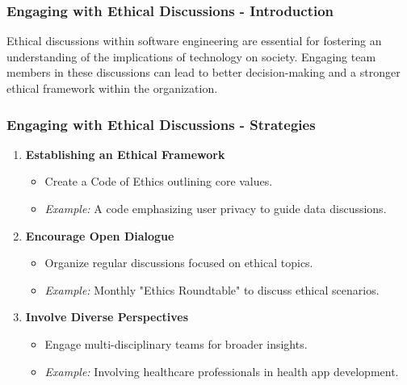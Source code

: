 \documentclass{beamer}
\begin{document}
\begin{frame}[fragile]
    \frametitle{Engaging with Ethical Discussions - Introduction}
    Ethical discussions within software engineering are essential for fostering an understanding of the implications of technology on society. Engaging team members in these discussions can lead to better decision-making and a stronger ethical framework within the organization.
\end{frame}

\begin{frame}[fragile]
    \frametitle{Engaging with Ethical Discussions - Strategies}
    \begin{enumerate}
        \item \textbf{Establishing an Ethical Framework}
        \begin{itemize}
            \item Create a Code of Ethics outlining core values.
            \item \textit{Example:} A code emphasizing user privacy to guide data discussions.
        \end{itemize}

        \item \textbf{Encourage Open Dialogue}
        \begin{itemize}
            \item Organize regular discussions focused on ethical topics.
            \item \textit{Example:} Monthly "Ethics Roundtable" to discuss ethical scenarios.
        \end{itemize}
        
        \item \textbf{Involve Diverse Perspectives}
        \begin{itemize}
            \item Engage multi-disciplinary teams for broader insights.
            \item \textit{Example:} Involving healthcare professionals in health app development.
        \end{itemize}
    \end{enumerate}
\end{frame}
\end{document}
